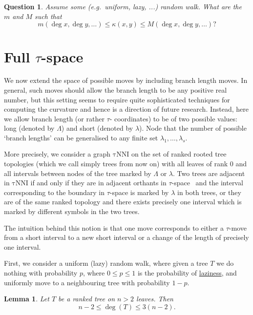 \documentclass{amsart}
\newtheorem{lemma}{Lemma}
\newtheorem{question}{Question}
\newcommand{\tN}{\mathrm{\tau NNI}}
\begin{document}
\proof

\endproof

\begin{question}
Assume some (e.g.\ uniform, lazy, ...) random walk. What are the $m$ and $M$ 
such that 
\[
m(\deg x,\deg y, \ldots) \leq \kappa(x,y) \leq M(\deg x, \deg y, \ldots)? 
\]
\end{question}

\section{Full $\tau$-space}

We now extend the space of possible moves by including branch length moves. 
In general, such moves should allow the branch length to be any positive real 
number, but this setting seems to require quite sophisticated techniques for 
computing the curvature and hence is a direction of future research. 
Instead, here we allow branch length (or rather $\tau$- coordinates) 
to be of two possible values: long (denoted by $\Lambda$) and short (denoted 
by $\lambda$). Node that the number of possible `branch lengths' can be 
generalised to any finite set $\lambda_1,\ldots,\lambda_s$.

More precisely, we consider a graph $\tN$ on the set of ranked rooted tree 
topologies (which we call simply trees from now on) with all leaves of rank 
$0$ and all intervals between nodes of the tree marked by $\Lambda$ or
$\lambda$. Two trees are adjacent in $\tN$ if and only if they are in 
adjacent orthants in $\tau$-space~\cite{GD} and the interval corresponding 
to the boundary in $\tau$-space is marked by $\lambda$ in both trees, 
or they are of the same ranked topology and there 
exists precisely one interval which is marked by different symbols in 
the two trees. 

The intuition behind this notion is that one move corresponds to either 
a $\tau$-move from a short interval to a new short interval or a change 
of the length of precisely one interval. 

First, we consider a uniform (lazy) random walk, where given a tree $T$ 
we do nothing with probability $p$, where $0\leq p\leq 1$ is the probability of 
\href{https://academichelp.net/wp-content/uploads/2014/01/laziness.jpg}{laziness},
and uniformly move to a neighbouring tree with probability $1-p$. 

\begin{lemma}
Let $T$ be a ranked tree on $n>2$ leaves. Then \[n-2\leq \deg(T)\leq3(n-2).\] 
\end{lemma}
\end{document}
